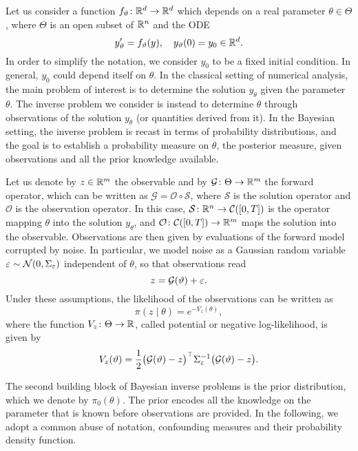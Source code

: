 \documentclass[10pt]{article}
\begin{document}
Let us consider a function $f_\vartheta \colon \mathbb{R}^d \to \mathbb{R}^d$ which depends on a real parameter $\theta \in \Theta$, where $\Theta$ is an open subset of $\mathbb{R}^n$ and the ODE
\begin{equation}\label{eq:ODEParam}
	y_\vartheta' = f_\vartheta(y), \quad y_\vartheta(0) = y_0 \in \mathbb{R}^d.
\end{equation}
In order to simplify the notation, we consider $y_0$ to be a fixed initial condition. In general, $y_0$ could depend itself on $\theta$. In the classical setting of numerical analysis, the main problem of interest is to determine the solution $y_\theta$ given the parameter $\theta$. The inverse problem we consider is instead to determine $\theta$ through observations of the solution $y_\theta$ (or quantities derived from it). In the Bayesian setting, the inverse problem is recast in terms of probability distributions, and the goal is to establish a probability measure on $\theta$, the posterior measure, given observations and all the prior knowledge available.

Let us denote by $z \in \mathbb{R}^m$ the observable and by $\mathcal G\colon \Theta \to \mathbb{R}^m$ the forward operator, which can be written as $\mathcal G = \mathcal O \circ \mathcal S$, where $\mathcal S$ is the solution operator and $\mathcal O$ is the observation operator. In this case, $\mathcal S \colon \mathbb{R}^n \to \mathcal C([0, T])$ is the operator mapping $\theta$ into the solution $y_\theta$, and $\mathcal O \colon \mathcal C([0, T]) \to \mathbb{R}^m$ maps the solution into the observable. Observations are then given by evaluations of the forward model corrupted by noise. In particular, we model noise as a Gaussian random variable $\varepsilon \sim \mathcal{N}(0, \Sigma_\varepsilon)$ independent of $\theta$, so that observations read
\begin{equation}
	z = \mathcal{G}(\vartheta) + \varepsilon.
\end{equation}
Under these assumptions, the likelihood of the observations can be written as
\begin{equation}
	\pi(z \mid \theta) = e^{-V_z(\theta)},
\end{equation}
where the function $V_z\colon\Theta \to \mathbb{R}$, called potential or negative log-likelihood, is given by
\begin{equation}
	V_z(\vartheta) = \frac{1}{2}\big(\mathcal{G}(\vartheta) - z\big)^\top \Sigma_\varepsilon^{-1} \big(\mathcal{G}(\vartheta) - z\big).
\end{equation}

The second building block of Bayesian inverse problems is the prior distribution, which we denote by $\pi_0(\theta)$. The prior encodes all the knowledge on the parameter that is known before observations are provided. In the following, we adopt a common abuse of notation, confounding measures and their probability density function. 
\end{document}
